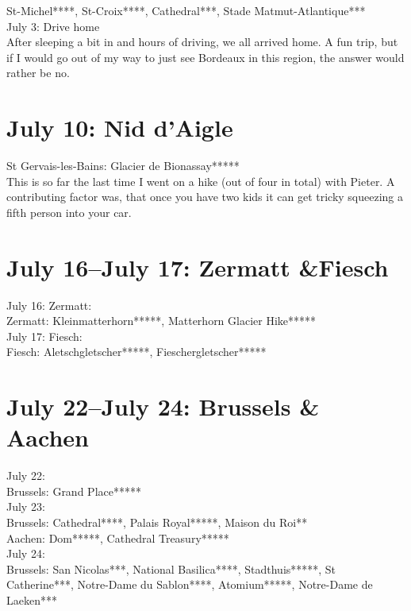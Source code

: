 St-Michel****, St-Croix****, Cathedral***, Stade Matmut-Atlantique***\\

July 3: Drive home\\
After sleeping a bit in and hours of driving, we all arrived home. A fun trip, but if I would go out of my way to just see Bordeaux in this region, the answer would rather be no.

\section{July 10: Nid d'Aigle}
\label{Niddaigle2016}

St Gervais-les-Bains: Glacier de Bionassay*****\\

This is so far the last time I went on a hike (out of four in total) with Pieter. A contributing factor was, that once you have two kids it can get tricky squeezing a fifth person into your car.\\

\section{July 16--July 17: Zermatt \&Fiesch}
\label{ZermattFiesch2016}

July 16: Zermatt:\\
Zermatt: Kleinmatterhorn*****, Matterhorn Glacier Hike*****\\

July 17: Fiesch:\\
Fiesch: Aletschgletscher*****, Fieschergletscher*****

\section{July 22--July 24: Brussels \& Aachen}
\label{Brussels2016}

July 22:\\
Brussels: Grand Place*****\\

July 23:\\
Brussels: Cathedral****, Palais Royal*****, Maison du Roi**\\
Aachen: Dom*****, Cathedral Treasury*****\\

July 24:\\
Brussels: San Nicolas***, National Basilica****, Stadthuis*****, St Catherine***, Notre-Dame du Sablon****,  Atomium*****, Notre-Dame de Laeken***

